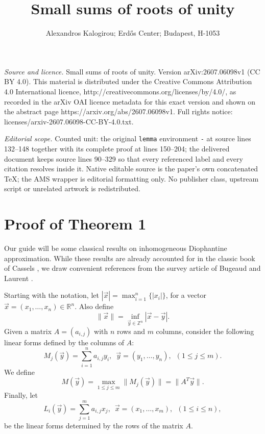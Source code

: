 \documentclass[10pt,a4paper]{amsart}
\newcommand{\Z}{\mathbb{Z}}
\begin{document}
\title[Small sums of roots of unity]{Small sums of roots of unity}
\author{Alexandros Kalogirou; Erdős Center; Budapest, H-1053}
\date{}
\maketitle
\noindent\emph{Source and licence.} Small sums of roots of unity. Version arXiv:2607.06098v1 (CC BY 4.0). This material is distributed under the Creative Commons Attribution 4.0 International licence, http://creativecommons.org/licenses/by/4.0/, as recorded in the arXiv OAI licence metadata for this exact version and shown on the abstract page https://arxiv.org/abs/2607.06098v1. Full rights notice: licenses/arxiv-2607.06098-CC-BY-4.0.txt.\par\smallskip
\noindent\textit{Editorial scope.} Counted unit: the original \texttt{lemma} environment \texttt{-} at source lines 132--148 together with its complete proof at lines 150--204; the delivered document keeps source lines 90--329 so that every referenced label and every citation resolves inside it. Native editable source is the paper's own concatenated TeX; the AMS wrapper is editorial formatting only. No publisher class, upstream script or unrelated artwork is redistributed.
\section{Proof of Theorem 1}
Our guide will be some classical results on inhomogeneous Diophantine approximation. While these results are already accounted for in the classic book of Cassels \cite{cassels}, we draw convenient references from the survey article of Bugeaud and Laurent \cite{transfer}.

Starting with the notation, let $|\vec{x}|=\max_{i=1}^n\{|x_i| \}$, for a vector $\vec{x}=(x_1,\dots, x_n)\in \mathbb{R}^n$. Also define
\begin{equation*}
    \| \vec{x} \|=\inf_{\vec{y}\in \Z^n}|\vec{x}-\vec{y}|.
\end{equation*}
Given a matrix $A=(a_{i,j})$ with $n$ rows and $m$ columns, consider the following linear forms defined by the columns of $A$:
\begin{equation}
    M_j(\vec{y})=\sum_{i=1}^n a_{i,j}y_i,\,\,\, \vec{y}=(y_1,\dots,y_n)   ,\,\,\, (1\leq j \leq m).
\end{equation}
We define
\begin{equation}
    M(\vec{y})=\max_{1\leq j \leq m}\| M_j(\vec{y}) \|=\|A^T\vec{y}\|.
\end{equation}
Finally, let 
\begin{equation}
    L_i(\vec{y})=\sum_{j=1}^m a_{i,j}x_j,\,\,\, \vec{x}=(x_1,\dots,x_m)   ,\,\,\, (1\leq i \leq n),
\end{equation}
be the linear forms determined by the rows of the matrix $A$. 
\end{document}
